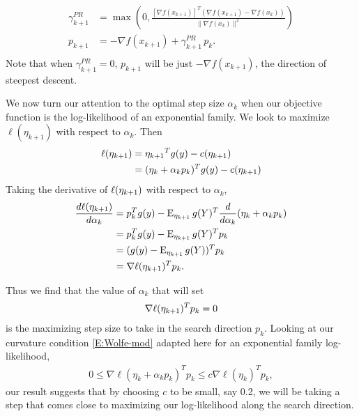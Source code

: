 \begin{align*}
	\gamma_{k+1}^{PR} &= \max \left( 0, \frac{ [ \nabla f( x_{k+1}) ]^T( \nabla f( x_{k+1} ) - \nabla f( x_k) )  }{ \parallel \nabla f( x_k) \parallel^2 } \right )\\
	p_{k+1} &= -\nabla f( x_{k+1}) + \gamma_{k+1}^{PR} \, p_k.\\
\end{align*}
Note that when $\gamma_{k+1}^{PR} = 0$, $p_{k+1}$ will be just $-\nabla f( x_{k+1})$, the direction of steepest descent.


We now turn our attention to the optimal step size $\alpha_k$ when our objective function is the log-likelihood of an exponential family.  We look to maximize $\ell( \eta_{k+1})$ with respect to $\alpha_k$.
Then
\begin{align*}
	\ell( \etak1 ) &= \etak1^T g(y) - c( \etak1 ) \\
				  &= ( \eta_k + \alpha_k p_k)^T g(y) - c( \etak1 )
\end{align*}
Taking the derivative of $\ell( \etak1)$ with respect to $\alpha_k$,
\begin{align*}
	\deriv{\ell( \etak1 )}{\alpha_k} &= p_k^T g(y) - \E_{\etak1}g(Y)^T \deriv{}{\alpha_k} (\eta_k + \alpha_k p_k ) \\
	&= p_k^T g(y) - \E_{\etak1}g(Y)^T p_k \\
	&= ( g(y) - \E_{\etak1} g(Y) )^T p_k \\
	&= \nabla \ell(\etak1)^T p_k.
\end{align*}

Thus we find that the value of $\alpha_k$ that will set 
\begin{align*}
	\nabla \ell( \etak1 )^T p_k = 0 
\end{align*}
is the maximizing step size to take in the search direction $p_k$.  Looking at our curvature condition \eqref{E:Wolfe-mod} adapted here for an exponential family log-likelihood,
\begin{align}
	 0 \leq  \nabla \ell( \eta_k + \alpha_k p_k)^T p_k \leq c \nabla \ell(\eta_k)^T p_k, \label{E:logcurvature}
\end{align}
our result suggests that by choosing $c$ to be small, say 0.2,  we will be taking a step that comes close to maximizing our log-likelihood along the search direction.

